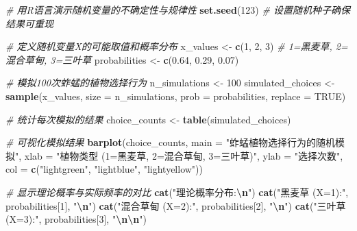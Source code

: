 \documentclass[
]{book}
\newenvironment{Shaded}{\begin{snugshade}}{\end{snugshade}}
\newcommand{\AttributeTok}[1]{\textcolor[rgb]{0.13,0.29,0.53}{#1}}
\newcommand{\CommentTok}[1]{\textcolor[rgb]{0.56,0.35,0.01}{\textit{#1}}}
\newcommand{\ConstantTok}[1]{\textcolor[rgb]{0.56,0.35,0.01}{#1}}
\newcommand{\DecValTok}[1]{\textcolor[rgb]{0.00,0.00,0.81}{#1}}
\newcommand{\FloatTok}[1]{\textcolor[rgb]{0.00,0.00,0.81}{#1}}
\newcommand{\FunctionTok}[1]{\textcolor[rgb]{0.13,0.29,0.53}{\textbf{#1}}}
\newcommand{\NormalTok}[1]{#1}
\newcommand{\OtherTok}[1]{\textcolor[rgb]{0.56,0.35,0.01}{#1}}
\newcommand{\SpecialCharTok}[1]{\textcolor[rgb]{0.81,0.36,0.00}{\textbf{#1}}}
\newcommand{\StringTok}[1]{\textcolor[rgb]{0.31,0.60,0.02}{#1}}
\begin{document}
\begin{Shaded}
\begin{Highlighting}[]
\CommentTok{\# 用R语言演示随机变量的不确定性与规律性}
\FunctionTok{set.seed}\NormalTok{(}\DecValTok{123}\NormalTok{)  }\CommentTok{\# 设置随机种子确保结果可重现}

\CommentTok{\# 定义随机变量X的可能取值和概率分布}
\NormalTok{x\_values }\OtherTok{\textless{}{-}} \FunctionTok{c}\NormalTok{(}\DecValTok{1}\NormalTok{, }\DecValTok{2}\NormalTok{, }\DecValTok{3}\NormalTok{)  }\CommentTok{\# 1=黑麦草, 2=混合草甸, 3=三叶草}
\NormalTok{probabilities }\OtherTok{\textless{}{-}} \FunctionTok{c}\NormalTok{(}\FloatTok{0.64}\NormalTok{, }\FloatTok{0.29}\NormalTok{, }\FloatTok{0.07}\NormalTok{)}

\CommentTok{\# 模拟100次蚱蜢的植物选择行为}
\NormalTok{n\_simulations }\OtherTok{\textless{}{-}} \DecValTok{100}
\NormalTok{simulated\_choices }\OtherTok{\textless{}{-}} \FunctionTok{sample}\NormalTok{(x\_values, }\AttributeTok{size =}\NormalTok{ n\_simulations,}
                            \AttributeTok{prob =}\NormalTok{ probabilities, }\AttributeTok{replace =} \ConstantTok{TRUE}\NormalTok{)}

\CommentTok{\# 统计每次模拟的结果}
\NormalTok{choice\_counts }\OtherTok{\textless{}{-}} \FunctionTok{table}\NormalTok{(simulated\_choices)}

\CommentTok{\# 可视化模拟结果}
\FunctionTok{barplot}\NormalTok{(choice\_counts,}
        \AttributeTok{main =} \StringTok{"蚱蜢植物选择行为的随机模拟"}\NormalTok{,}
        \AttributeTok{xlab =} \StringTok{"植物类型 (1=黑麦草, 2=混合草甸, 3=三叶草)"}\NormalTok{,}
        \AttributeTok{ylab =} \StringTok{"选择次数"}\NormalTok{,}
        \AttributeTok{col =} \FunctionTok{c}\NormalTok{(}\StringTok{"lightgreen"}\NormalTok{, }\StringTok{"lightblue"}\NormalTok{, }\StringTok{"lightyellow"}\NormalTok{))}

\CommentTok{\# 显示理论概率与实际频率的对比}
\FunctionTok{cat}\NormalTok{(}\StringTok{"理论概率分布:}\SpecialCharTok{\textbackslash{}n}\StringTok{"}\NormalTok{)}
\FunctionTok{cat}\NormalTok{(}\StringTok{"黑麦草 (X=1):"}\NormalTok{, probabilities[}\DecValTok{1}\NormalTok{], }\StringTok{"}\SpecialCharTok{\textbackslash{}n}\StringTok{"}\NormalTok{)}
\FunctionTok{cat}\NormalTok{(}\StringTok{"混合草甸 (X=2):"}\NormalTok{, probabilities[}\DecValTok{2}\NormalTok{], }\StringTok{"}\SpecialCharTok{\textbackslash{}n}\StringTok{"}\NormalTok{)}
\FunctionTok{cat}\NormalTok{(}\StringTok{"三叶草 (X=3):"}\NormalTok{, probabilities[}\DecValTok{3}\NormalTok{], }\StringTok{"}\SpecialCharTok{\textbackslash{}n\textbackslash{}n}\StringTok{"}\NormalTok{)}


\end{Highlighting}
\end{Shaded}
\end{document}
